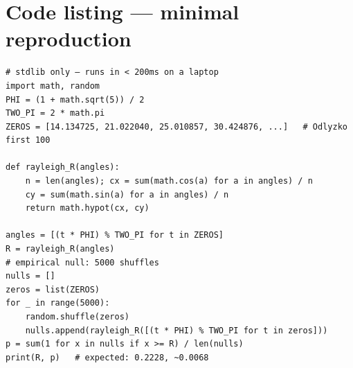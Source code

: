 \documentclass[11pt,a4paper]{article}
\begin{document}
\section{Code listing — minimal reproduction}
\small
\begin{verbatim}
# stdlib only — runs in < 200ms on a laptop
import math, random
PHI = (1 + math.sqrt(5)) / 2
TWO_PI = 2 * math.pi
ZEROS = [14.134725, 21.022040, 25.010857, 30.424876, ...]   # Odlyzko first 100

def rayleigh_R(angles):
    n = len(angles); cx = sum(math.cos(a) for a in angles) / n
    cy = sum(math.sin(a) for a in angles) / n
    return math.hypot(cx, cy)

angles = [(t * PHI) % TWO_PI for t in ZEROS]
R = rayleigh_R(angles)
# empirical null: 5000 shuffles
nulls = []
zeros = list(ZEROS)
for _ in range(5000):
    random.shuffle(zeros)
    nulls.append(rayleigh_R([(t * PHI) % TWO_PI for t in zeros]))
p = sum(1 for x in nulls if x >= R) / len(nulls)
print(R, p)   # expected: 0.2228, ~0.0068
\end{verbatim}
\end{document}
